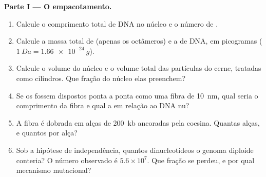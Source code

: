 \begin{problem}
\medskip
\noindent\textbf{Parte I --- O empacotamento.}
\begin{enumerate}
  \item Calcule o comprimento total de DNA no núcleo e o número de
        .
  \item Calcule a massa total de  (apenas os octâmeros) e a de
        DNA, em picogramas ($\qty{1}{Da} = \qty{1.66e-24}{g}$).
  \item Calcule o volume do núcleo e o volume total das partículas do
        cerne, tratadas como cilindros. Que fração do núcleo elas
        preenchem?
  \item Se os  fossem dispostos ponta a ponta como uma
        fibra de \qty{10}{nm}, qual seria o comprimento da fibra e
        qual a  em relação ao DNA nu?
  \item A fibra é dobrada em alças de \qty{200}{kb} ancoradas pela
        coesina. Quantas alças, e quantos  por alça?
  \item Sob a hipótese de independência, quantos dinucleotídeos  o
        genoma diploide conteria? O número observado é
        $5.6\times 10^{7}$. Que fração se perdeu, e por qual
        mecanismo mutacional?
\end{enumerate}


\end{problem}

